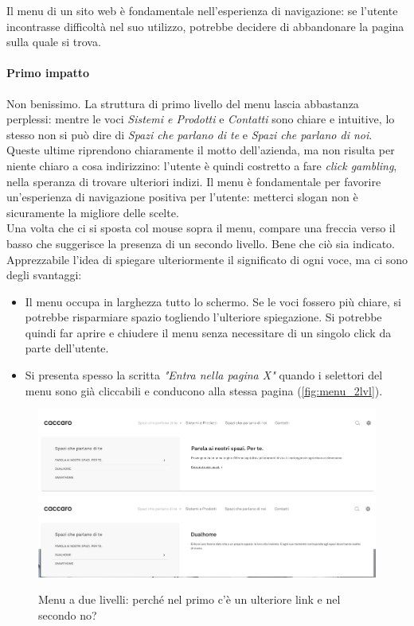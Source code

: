 Il menu di un sito web è fondamentale nell'esperienza di navigazione: se l'utente incontrasse difficoltà nel suo utilizzo, potrebbe decidere di abbandonare la pagina sulla quale si trova.

\paragraph*{Primo impatto} Non benissimo. La struttura di primo livello del menu lascia abbastanza perplessi: mentre le voci \textit{Sistemi e Prodotti} e \textit{Contatti} sono chiare e intuitive, lo stesso non si può dire di \textit{Spazi che parlano di te} e \textit{Spazi che parlano di noi}. Queste ultime riprendono chiaramente il motto dell'azienda, ma non risulta per niente chiaro a cosa indirizzino: l'utente è quindi costretto a fare \textit{click gambling}, nella speranza di trovare ulteriori indizi. Il menu è fondamentale per favorire un'esperienza di navigazione positiva per l'utente: metterci slogan non è sicuramente la migliore delle scelte.\\
Una volta che ci si sposta col mouse sopra il menu, compare una freccia verso il basso che suggerisce la presenza di un secondo livello. Bene che ciò sia indicato.\\
Apprezzabile l'idea di spiegare ulteriormente il significato di ogni voce, ma ci sono degli svantaggi:
\begin{itemize}	
	\item Il menu occupa in larghezza tutto lo schermo. Se le voci fossero più chiare, si potrebbe risparmiare spazio togliendo l'ulteriore spiegazione. Si potrebbe quindi far aprire e chiudere il menu senza necessitare di un singolo click da parte dell'utente.
	\item Si presenta spesso la scritta \textit{"Entra nella pagina X"} quando i selettori del menu sono già cliccabili e conducono alla stessa pagina (\autoref{fig:menu_2lvl}).
\end{itemize}

\begin{figure}
	\centering
	\includegraphics[width=\textwidth]{sez/Elementi_Comuni/img/menu_STD.png}
	\includegraphics[width=\textwidth]{sez/Elementi_Comuni/img/menu_STD2.png}
	\caption{Menu a due livelli: perché nel primo c'è un ulteriore link e nel secondo no?}
	\label{fig:menu_2lvl}
\end{figure}

